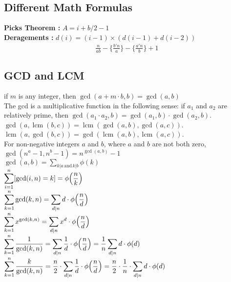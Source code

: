 \begin{multicols*}{3}
\subsection{Different Math Formulas}
\textbf{Picks Theorem : } $ A = i + b / 2 - 1 $ \\ 
\textbf{Deragements : } $ d(i) = (i - 1) \times \left( d(i - 1) + d(i - 2) \right) $ \\ 
\begin{multline*}
\displaystyle \frac{n}{ab}-\Big\{\frac{b{\prime} n}{a}\Big\}-\Big\{\frac{a{\prime} n}{b}\Big\} + 1
\end{multline*}
\subsection{GCD and LCM}
if $m$ is any integer, then $\displaystyle \gcd(a + m {\cdot} b, b) = \gcd(a, b)$ \\
The gcd is a multiplicative function in the following sense: if $\displaystyle a_1$ and $\displaystyle a_2$ are relatively prime, then $\displaystyle \gcd(a_1 \cdot a_2, b) = \gcd(a_1, b) \cdot \gcd(a_2,b )$. \\
$\displaystyle \gcd(a, \operatorname{lcm}(b, c)) = \operatorname{lcm}(\gcd(a, b), \gcd(a, c))$. \\
$\displaystyle \operatorname{lcm}(a, \gcd(b, c)) = \gcd(\operatorname{lcm}(a, b), \operatorname{lcm}(a, c))$. \\
For non-negative integers $\displaystyle a$ and $b$, where $\displaystyle a$ and $b$ are not both zero, $\displaystyle \gcd({n^a} - 1, {n^b} - 1) = n^{\gcd(a,b)} - 1$ \\
$\displaystyle \gcd(a, b) = \displaystyle \sum_{k|a \, \text{and} \, k|b} {\phi(k)}$ \\
$\displaystyle \displaystyle \sum_{i=1}^n [\gcd(i, n) = k] = { \phi{\left(\frac{n}{k}\right)}}$ \\
$\displaystyle \displaystyle \sum_{k=1}^n \gcd(k, n) = \displaystyle \sum_{d|n} d \cdot {\phi{\left(\frac{n}{d}\right)}}$ \\
$\displaystyle \displaystyle \sum_{k=1}^n x^{\gcd(k,n)} = \displaystyle \sum_{d|n} x^d \cdot {\phi{\left(\frac{n}{d}\right)}}$ \\
$\displaystyle \displaystyle \sum_{k=1}^n \frac{1}{\gcd(k, n)} = \displaystyle \sum_{d|n} \frac{1}{d} \cdot {\phi{\left(\frac{n}{d}\right)}} = \frac{1}{n} \displaystyle \sum_{d|n} d \cdot \phi(d)$ \\
$\displaystyle \displaystyle \sum_{k=1}^n \frac{k}{\gcd(k, n)} = \frac{n}{2} \cdot \displaystyle \sum_{d|n} \frac{1}{d} \cdot {\phi{\left(\frac{n}{d}\right)}} = \frac{n}{2} \cdot \frac{1}{n} \cdot \displaystyle \sum_{d|n} d \cdot \phi(d)$ \\

\end{multicols*}
